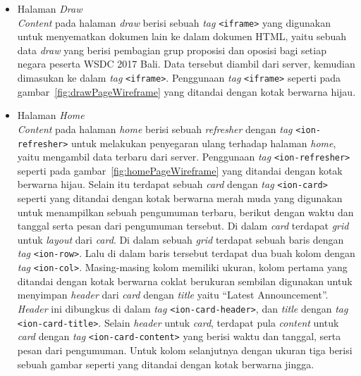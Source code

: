 \begin{enumerate}
\begin{itemize}
				\item Halaman \textit{Draw} \\
					\textit{Content} pada halaman \textit{draw} berisi sebuah \textit{tag} \texttt{<iframe>} yang digunakan untuk menyematkan dokumen lain ke dalam dokumen HTML, yaitu sebuah data \textit{draw} yang berisi pembagian grup proposisi dan oposisi bagi setiap negara peserta WSDC 2017 Bali. Data tersebut diambil dari server, kemudian dimasukan ke dalam \textit{tag} \texttt{<iframe>}. Penggunaan \textit{tag} \texttt{<iframe>} seperti pada gambar~\ref{fig:drawPageWireframe} yang ditandai dengan kotak berwarna hijau.
					
				\item Halaman \textit{Home} \\
					\textit{Content} pada halaman \textit{home} berisi sebuah \textit{refresher} dengan \textit{tag} \texttt{<ion-refresher>} untuk melakukan penyegaran ulang terhadap halaman \textit{home}, yaitu mengambil data terbaru dari server. Penggunaan \textit{tag} \texttt{<ion-refresher>} seperti pada gambar~\ref{fig:homePageWireframe} yang ditandai dengan kotak berwarna hijau. Selain itu terdapat sebuah \textit{card} dengan \textit{tag} \texttt{<ion-card>} seperti yang ditandai dengan kotak berwarna merah muda yang digunakan untuk menampilkan sebuah pengumuman terbaru, berikut dengan waktu dan tanggal serta pesan dari pengumuman tersebut. Di dalam \textit{card} terdapat \textit{grid} untuk \textit{layout} dari \textit{card}. Di dalam sebuah \textit{grid} terdapat sebuah baris dengan \textit{tag} \texttt{<ion-row>}. Lalu di dalam baris tersebut terdapat dua buah kolom dengan \textit{tag} \texttt{<ion-col>}. Masing-masing kolom memiliki ukuran, kolom pertama yang ditandai dengan kotak berwarna coklat berukuran sembilan digunakan untuk menyimpan \textit{header} dari \textit{card} dengan \textit{title} yaitu ``Latest Announcement''. \textit{Header} ini dibungkus di dalam \textit{tag} \texttt{<ion-card-header>}, dan \textit{title} dengan \textit{tag} \texttt{<ion-card-title>}. Selain \textit{header} untuk \textit{card}, terdapat pula \textit{content} untuk \textit{card} dengan \textit{tag} \texttt{<ion-card-content>} yang berisi waktu dan tanggal, serta pesan dari pengumuman. Untuk kolom selanjutnya dengan ukuran tiga berisi sebuah gambar seperti yang ditandai dengan kotak berwarna jingga.
					

\end{itemize}
\end{enumerate}
